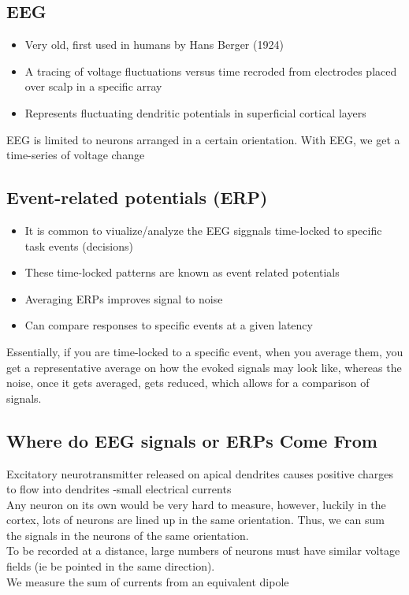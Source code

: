 \subsection{EEG}
\begin{itemize}
    \item Very old, first used in humans by Hans Berger (1924)
    \item A tracing of voltage fluctuations versus time recroded from electrodes placed over scalp in a specific array
    \item Represents fluctuating dendritic potentials in superficial cortical layers
\end{itemize}
EEG is limited to neurons arranged in a certain orientation. 
With EEG, we get a time-series of voltage change
\subsection{Event-related potentials (ERP)}
\begin{itemize}
    \item It is common to viualize/analyze the EEG siggnals time-locked to specific task events (decisions)
    \item These time-locked patterns are known as event related potentials
    \item Averaging ERPs improves signal to noise
    \item Can compare responses to specific events at a given latency
\end{itemize}
Essentially, if you are time-locked to a specific event, when you average them, you get a representative average on how the evoked signals may look like, whereas the noise, once it gets averaged, gets reduced, which allows for a comparison of signals.
\subsection{Where do EEG signals or ERPs Come From}
Excitatory neurotransmitter released on apical dendrites causes positive charges to flow into dendrites -small electrical currents
\\Any neuron on its own would be very hard to measure, however, luckily in the cortex, lots of neurons are lined up in the same orientation. Thus, we can sum the signals in the neurons of the same orientation. 
\\To be recorded at a distance, large numbers of neurons must have similar voltage fields (ie be pointed in the same direction).
\\We measure the sum of currents from an equivalent dipole
